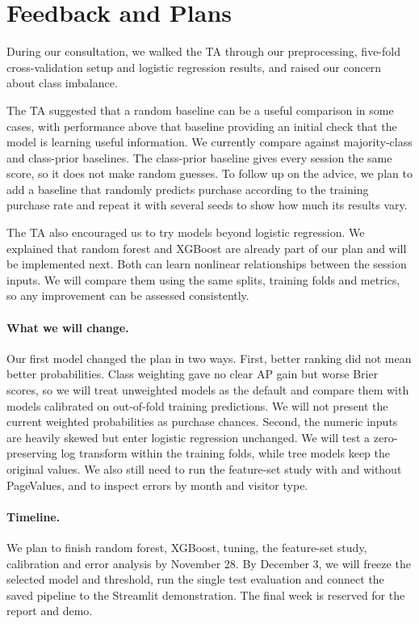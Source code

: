 \documentclass[11pt]{article}
\begin{document}
\section{Feedback and Plans}

During our consultation, we walked the TA through our preprocessing,
five-fold cross-validation setup and logistic regression results, and raised
our concern about class imbalance.

The TA suggested that a random baseline can be a useful comparison in some
cases, with performance above that baseline providing an initial check that
the model is learning useful information. We currently compare against
majority-class and class-prior baselines. The class-prior baseline gives
every session the same score, so it does not make random guesses. To follow
up on the advice, we plan to add a baseline that randomly predicts purchase
according to the training purchase rate and repeat it with several seeds
to show how much its results vary.

The TA also encouraged us to try models beyond logistic regression. We
explained that random forest and XGBoost are already part of our plan and
will be implemented next. Both can learn nonlinear relationships between
the session inputs. We will compare them using the same splits, training
folds and metrics, so any improvement can be assessed consistently.

\paragraph{What we will change.} Our first model changed the plan in two
ways. First, better ranking did not mean better probabilities. Class
weighting gave no clear AP gain but worse Brier scores, so we will treat
unweighted models as the default and compare them with models calibrated on
out-of-fold training predictions. We will not present the current weighted
probabilities as purchase chances. Second, the numeric inputs are heavily
skewed but enter logistic regression unchanged. We will test a
zero-preserving log transform within the training folds, while tree models
keep the original values. We also still need to run the feature-set study
with and without PageValues, and to inspect errors by month and visitor type.

\paragraph{Timeline.} We plan to finish random forest, XGBoost, tuning, the
feature-set study, calibration and error analysis by November 28. By
December 3, we will freeze the selected model and threshold, run the single
test evaluation and connect the saved pipeline to the Streamlit
demonstration. The final week is reserved for the report and demo.
\end{document}
